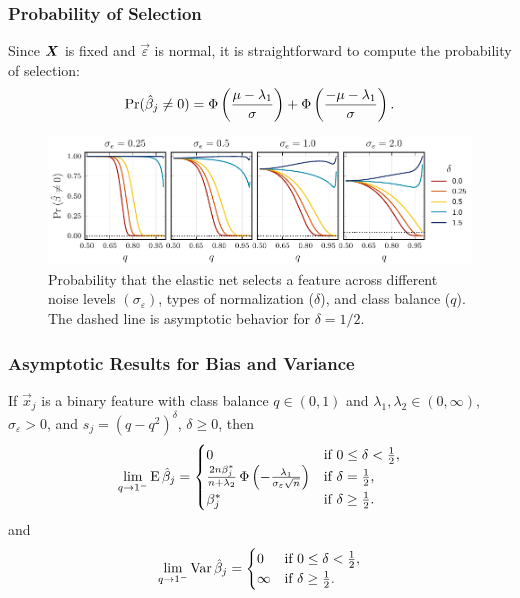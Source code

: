 \documentclass[10pt]{beamer}
\begin{document}
\begin{frame}[c]
  \frametitle{Probability of Selection}

  Since \(\boldsymbol{X}\) is fixed and \(\vec{\varepsilon}\) is normal, it is straightforward to
  compute the probability of selection:
  \[
    \Pr(\hat{\beta}_j \neq 0) = \operatorname{\Phi}\left(\frac{\mu - \lambda_1}{\sigma}\right) + \operatorname{\Phi}\left(\frac{- \mu -\lambda_1}{\sigma}\right).
  \]

  \begin{figure}[htpb]
    \centering
    \includegraphics[width=\textwidth]{figures/selection_probability.pdf}
    \caption{%
      Probability that the elastic net selects a feature across different noise levels \((\sigma_\varepsilon)\), types of normalization (\(\delta\)), and class balance (\(q\)).
      The dashed line is asymptotic behavior for \(\delta = 1/2\).
    }
  \end{figure}
\end{frame}

\begin{frame}[c]
  \frametitle{Asymptotic Results for Bias and Variance}

  \begin{theorem}
    If \(\vec{x}_j\) is a binary feature with class balance \(q \in (0, 1)\) and \(\lambda_1,\lambda_2 \in (0,\infty)\), \(\sigma_\varepsilon > 0\), and \(s_j = (q - q^2)^{\delta}\), \(\delta \geq 0\), then
    \[
      \lim_{q \rightarrow 1^-} \operatorname{E} \hat{\beta}_j =
      \begin{cases}
        0                                                                                                  & \text{if } 0 \leq \delta < \frac{1}{2}, \\
        \frac{2n \beta_j^*}{n + \lambda_2} \operatorname{\Phi}\left(-\frac{\lambda_1}{\sigma_\varepsilon \sqrt{n}}\right) & \text{if } \delta = \frac{1}{2},        \\
        \beta^*_j                                                                                          & \text{if } \delta \geq \frac{1}{2}.
      \end{cases}
    \]
    \pause and
    \[
      \lim_{q \rightarrow 1^-} \operatorname{Var} \hat{\beta}_j =
      \begin{cases}
        0      & \text{if } 0 \leq \delta < \frac{1}{2}, \\
        \infty & \text{if } \delta \geq \frac{1}{2}.
      \end{cases}
    \]
  \end{theorem}

\end{frame}
\end{document}

